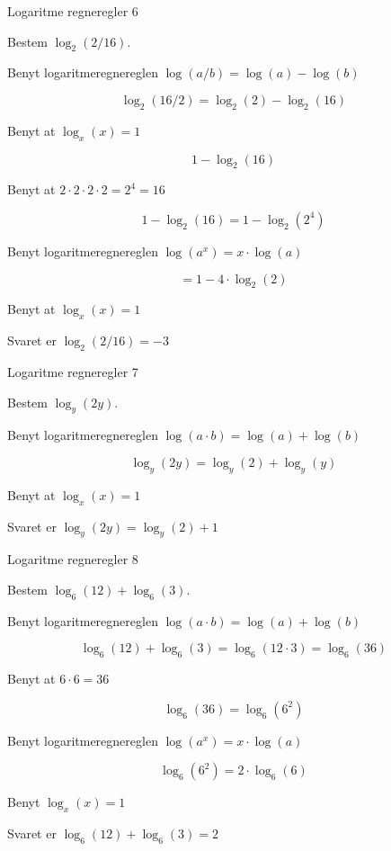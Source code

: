 \documentclass{article}
\begin{document}
\newpage
\begin{exercise}{Logaritme regneregler 6}
	
	Bestem $\log_{2}(2/16) $.
	
	
	\hint
	
	Benyt logaritmeregnereglen $\log(a / b) =  \log(a) - \log(b)$
	
	\hint
	\[
	\log_{2}(16/2) = \log_{2}(2) -  \log_{2}(16)
	\]
	
	\hint 
	Benyt at $\log_{x}(x) = 1$
	
	\hint
	\[
	1 - \log_{2}(16)
	\]
	
	\hint
	Benyt at $2 \cdot 2 \cdot 2 \cdot 2 = 2^4 = 16$
	
	\hint
	\[
	1 - \log_{2}(16) = 1 - \log_{2}(2^4)
	\]
	
	\hint
	Benyt logaritmeregnereglen $\log(a^x) = x \cdot \log(a)$
		
	\hint
	\[	 
	= 1- 4 \cdot \log_{2}(2)
	\]
	
	\hint 
	Benyt at $\log_{x}(x) = 1$
	
	\hint
	
	Svaret er $\log_{2}(2/16) = -3 $
\end{exercise}

\newpage
\begin{exercise}{Logaritme regneregler 7}
	
	Bestem $\log_{y}(2y) $.
	
	
	\hint
	
	Benyt logaritmeregnereglen $\log(a \cdot  b) =  \log(a) + \log(b)$
	
	\hint
	\[
	\log_{y}(2y) = \log_{y}(2) + \log_{y}(y)
	\]
	
	\hint 
	Benyt at $\log_{x}(x) = 1$
	
	\hint
	
	Svaret er $\log_{y}(2y) = \log_{y}(2) + 1 $
\end{exercise}

\newpage
\begin{exercise}{Logaritme regneregler 8}
	
	Bestem $\log_{6}(12) + \log_{6}(3)$.
	
	
	\hint
	
	Benyt logaritmeregnereglen $\log(a \cdot b) =  \log(a) + \log(b)$
	
	\hint
	\[
	\log_{6}(12) + \log_{6}(3) = \log_{6}(12 \cdot 3) = \log_{6}(36)
	\]
	
	\hint
	Benyt at $6 \cdot 6  = 36$
		
	\hint 
	\[
	\log_{6}(36) = \log_{6}(6^2)
	\]
	
	\hint
	Benyt logaritmeregnereglen $\log(a^x) = x \cdot \log(a)$

	\hint
	\[
	 \log_{6}(6^2) = 2 \cdot \log_{6}(6)
	\]
	
	\hint
	Benyt $\log_{x}(x) = 1$
	
	\hint
	
	Svaret er $\log_{6}(12) + \log_{6}(3) = 2$
\end{exercise}
\end{document}
